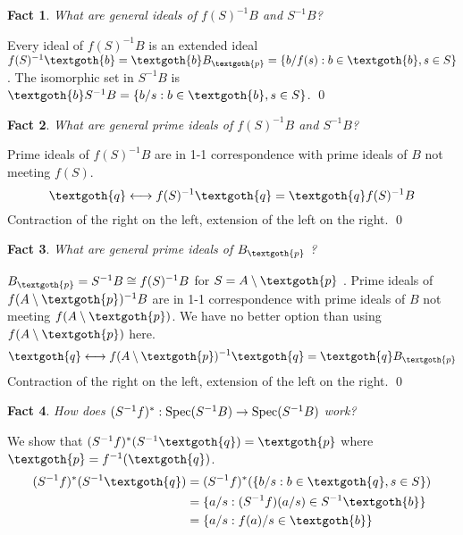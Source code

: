 \documentclass{article}
\newtheorem{theorem}{Fact}[section]
\begin{document}
\bigskip
\begin{theorem}
What are general ideals of $f(S)^{-1}B$ and $S^{-1}B$?
\end{theorem}

\noindent
Every ideal of $f(S)^{-1}B$ is an extended ideal $f(S)^{-1}\textgoth{b} = \textgoth{b}B_\textgoth{p} = \{b/f(s): b\in \textgoth{b}, s \in S\}$. The isomorphic set in $S^{-1}B$ is $\textgoth{b}S^{-1}B = \{b/s: b\in \textgoth{b}, s \in S\}$.
\qed

\bigskip
\begin{theorem}
What are general prime ideals of $f(S)^{-1}B$ and $S^{-1}B$?
\end{theorem}

\noindent
Prime ideals of $f(S)^{-1}B$ are in 1-1 correspondence with prime ideals of $B$ not meeting $f(S)$.
\[
  \textgoth{q} \longleftrightarrow f(S)^{-1}\textgoth{q} = \textgoth{q}f(S)^{-1}B
\]
Contraction of the right on the left, extension of the left on the right.
\qed

\bigskip
\begin{theorem}
What are general prime ideals of $B_\textgoth{p}$ ?
\end{theorem}

\noindent
$B_\textgoth{p} = S^{-1}B \cong f(S)^{-1}B$ for $S = A \setminus \textgoth{p}$ . Prime ideals of $f(A \setminus \textgoth{p})^{-1}B$ are in 1-1 correspondence with prime ideals of $B$ not meeting $f(A \setminus \textgoth{p})$. We have no better option than using $f(A \setminus \textgoth{p})$ here.
\[
  \textgoth{q} \longleftrightarrow f(A \setminus \textgoth{p})^{-1}\textgoth{q} = \textgoth{q}B_\textgoth{p}
\]
Contraction of the right on the left, extension of the left on the right.
\qed

\bigskip
\begin{theorem}
How does $(S^{-1}f)^*: \textnormal{Spec}(S^{-1}B) \rightarrow \text{Spec}(S^{-1}B)$ work? 
\end{theorem}

\noindent
We show that $(S^{-1}f)^*(S^{-1}\textgoth{q}) = \textgoth{p}$ where $\textgoth{p} = f^{-1}(\textgoth{q})$.
\begin{equation*}
\begin{split}
  (S^{-1}f)^*(S^{-1}\textgoth{q}) 
    & = (S^{-1}f)^*(\{ b/s: b \in \textgoth{q}, s \in S\}) \\
    & = \{ a/s: (S^{-1}f)(a/s) \in S^{-1}\textgoth{b} \} \\
    & = \{ a/s: f(a)/s \in \textgoth{b} \}
\end{split}
\end{equation*}
\end{document}
